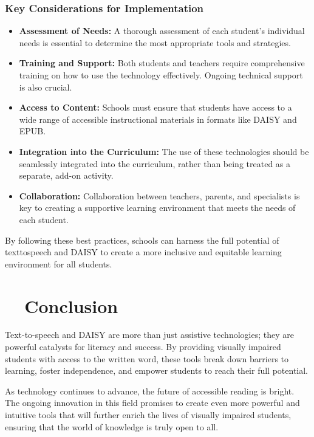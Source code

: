 \subsubsection{Key Considerations for Implementation}

\begin{itemize}
	\item \textbf{Assessment of Needs:} A thorough assessment of each student's individual needs is essential to determine the most appropriate tools and strategies.
	\item \textbf{Training and Support:} Both students and teachers require comprehensive training on how to use the technology effectively. Ongoing technical support is also crucial.
	\item \textbf{Access to Content:} Schools must ensure that students have access to a wide range of accessible instructional materials in formats like DAISY and EPUB.
	\item \textbf{Integration into the Curriculum:} The use of these technologies should be seamlessly integrated into the curriculum, rather than being treated as a separate, add-on activity.
	\item \textbf{Collaboration:} Collaboration between teachers, parents, and specialists is key to creating a supportive learning environment that meets the needs of each student.
\end{itemize}

By following these best practices, schools can harness the full potential of \gls{texttospeech} and DAISY to create a more inclusive and equitable learning environment for all students.

\section{~~Conclusion}

Text-to-speech and DAISY are more than just assistive technologies; they are powerful catalysts for literacy and success. By providing visually impaired students with access to the written word, these tools break down barriers to learning, foster independence, and empower students to reach their full potential.\supercite{StudentOutcomesResearch, wjaets2024}

As \gls{technology} continues to advance, the future of accessible reading is bright. The ongoing innovation in this field promises to create even more powerful and intuitive tools that will further enrich the lives of visually impaired students, ensuring that the world of knowledge is truly open to all.\supercite{maitraye2024, arxiv2503}
